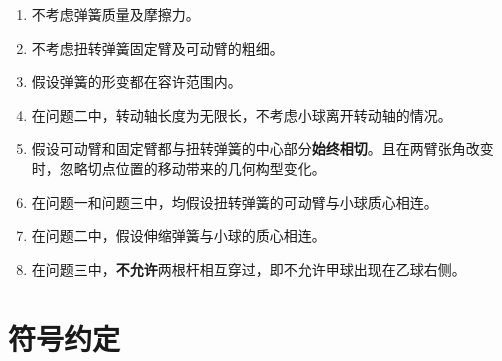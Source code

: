 \documentclass[a4paper,c5size,twoside,UTF8]{ctexart} %
\numberwithin{equation}{section}   %
\begin{document}
\begin{enumerate}
    \item 不考虑弹簧质量及摩擦力。
    \item 不考虑扭转弹簧固定臂及可动臂的粗细。
    \item 假设弹簧的形变都在容许范围内。
    \item 在问题二中，转动轴长度为无限长，不考虑小球离开转动轴的情况。
    \item 假设可动臂和固定臂都与扭转弹簧的中心部分\textbf{始终相切}。且在两臂张角改变时，忽略切点位置的移动带来的几何构型变化。
    \item 在问题一和问题三中，均假设扭转弹簧的可动臂与小球质心相连。
	\item 在问题二中，假设伸缩弹簧与小球的质心相连。
    \item 在问题三中，\textbf{不允许}两根杆相互穿过，即不允许甲球出现在乙球右侧。
\end{enumerate}

\newpage

\section{符号约定}

\vspace{-3em}
\end{document}
